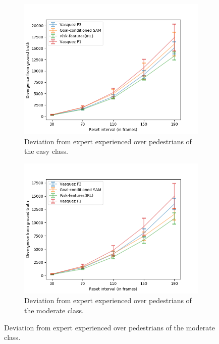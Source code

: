 \begin{figure}[htbp]
	\begin{subfigure}{0.5\textwidth}
		\centering
		\includegraphics[width=\linewidth]{plots/ucy_inter_irl_new/drift_easy_ucy_inter_irl.png}
		\caption {Deviation from expert experienced over pedestrians of the easy class.}
		\label{fig:inter_IRL-drift_analysis_easy}
	\end{subfigure}
	\begin{subfigure}{0.5\textwidth}
		\centering
		\includegraphics[width=\linewidth]{plots/ucy_inter_irl_new/drift_med_ucy_inter_irl.png}
		\caption {Deviation from expert experienced over pedestrians of the moderate class.}
		\label{fig:inter_IRL-drift_analysis_med}

\end{subfigure}
\end{figure}
